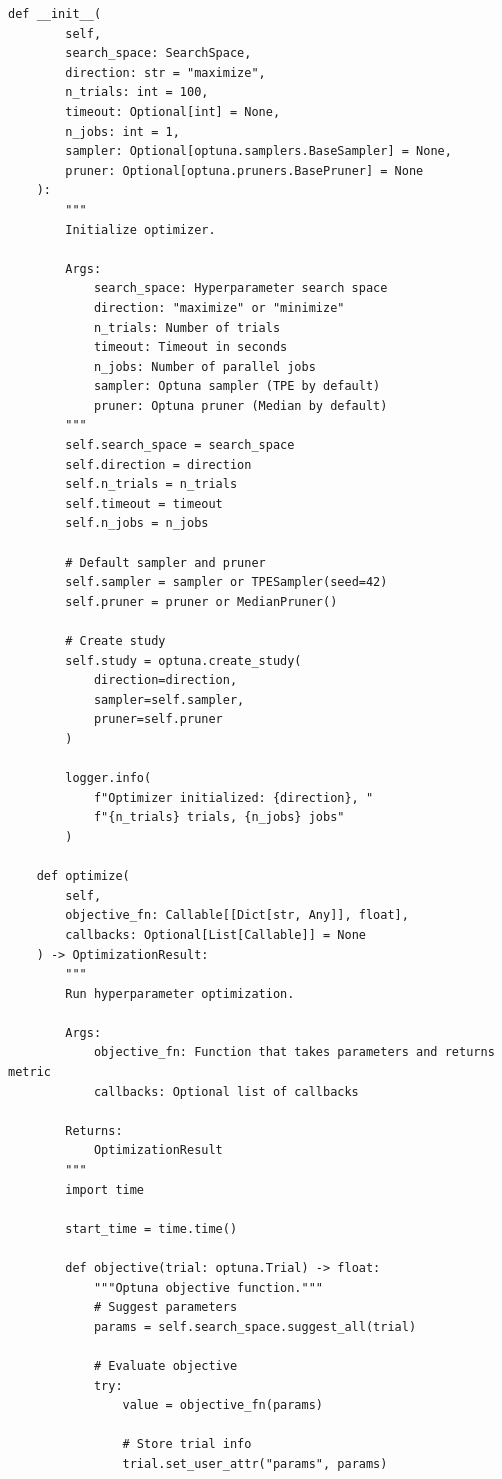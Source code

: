 \begin{lstlisting}[style=python, caption={Hyperparameter optimization with Optuna}]
    def __init__(
        self,
        search_space: SearchSpace,
        direction: str = "maximize",
        n_trials: int = 100,
        timeout: Optional[int] = None,
        n_jobs: int = 1,
        sampler: Optional[optuna.samplers.BaseSampler] = None,
        pruner: Optional[optuna.pruners.BasePruner] = None
    ):
        """
        Initialize optimizer.

        Args:
            search_space: Hyperparameter search space
            direction: "maximize" or "minimize"
            n_trials: Number of trials
            timeout: Timeout in seconds
            n_jobs: Number of parallel jobs
            sampler: Optuna sampler (TPE by default)
            pruner: Optuna pruner (Median by default)
        """
        self.search_space = search_space
        self.direction = direction
        self.n_trials = n_trials
        self.timeout = timeout
        self.n_jobs = n_jobs

        # Default sampler and pruner
        self.sampler = sampler or TPESampler(seed=42)
        self.pruner = pruner or MedianPruner()

        # Create study
        self.study = optuna.create_study(
            direction=direction,
            sampler=self.sampler,
            pruner=self.pruner
        )

        logger.info(
            f"Optimizer initialized: {direction}, "
            f"{n_trials} trials, {n_jobs} jobs"
        )

    def optimize(
        self,
        objective_fn: Callable[[Dict[str, Any]], float],
        callbacks: Optional[List[Callable]] = None
    ) -> OptimizationResult:
        """
        Run hyperparameter optimization.

        Args:
            objective_fn: Function that takes parameters and returns metric
            callbacks: Optional list of callbacks

        Returns:
            OptimizationResult
        """
        import time

        start_time = time.time()

        def objective(trial: optuna.Trial) -> float:
            """Optuna objective function."""
            # Suggest parameters
            params = self.search_space.suggest_all(trial)

            # Evaluate objective
            try:
                value = objective_fn(params)

                # Store trial info
                trial.set_user_attr("params", params)


\end{lstlisting}

